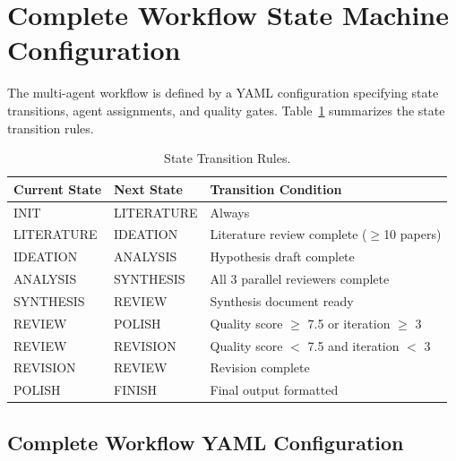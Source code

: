 \documentclass[runningheads]{llncs}
\begin{document}
\section{Complete Workflow State Machine Configuration}
\label{app:workflow_config}

The multi-agent workflow is defined by a YAML configuration specifying state transitions, agent assignments, and quality gates. Table~\ref{tab:state_transitions} summarizes the state transition rules.

\begin{table}[h]
\centering
\small
\begin{tabular}{llp{6cm}}
\toprule
\textbf{Current State} & \textbf{Next State} & \textbf{Transition Condition} \\
\midrule
INIT & LITERATURE & Always \\
LITERATURE & IDEATION & Literature review complete ($\geq$10 papers) \\
IDEATION & ANALYSIS & Hypothesis draft complete \\
ANALYSIS & SYNTHESIS & All 3 parallel reviewers complete \\
SYNTHESIS & REVIEW & Synthesis document ready \\
REVIEW & POLISH & Quality score $\geq$ 7.5 or iteration $\geq$ 3 \\
REVIEW & REVISION & Quality score $<$ 7.5 and iteration $<$ 3 \\
REVISION & REVIEW & Revision complete \\
POLISH & FINISH & Final output formatted \\
\bottomrule
\end{tabular}
\caption{State Transition Rules.}
\label{tab:state_transitions}
\end{table}

\subsection{Complete Workflow YAML Configuration}
\end{document}
